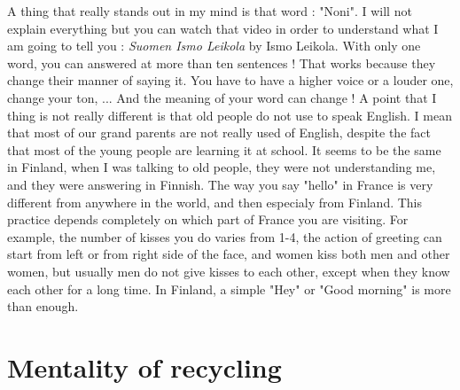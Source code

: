 \documentclass[a4paper,12pt]{report} %
\begin{document}
{A thing that really stands out in my mind is that word : "Noni". I will not explain everything but you can watch that video in order to understand what I am going to tell you : \textit{Suomen Ismo Leikola} by Ismo Leikola. With only one word, you can answered at more than ten sentences ! That works because they change their manner of saying it. You have to have a higher voice or a louder one, change your ton, ... And the meaning of your word can change ! \newline
A point that I thing is not really different is that old people do not use to speak English. I mean that most of our grand parents are not really used of English, despite the fact that most of the young people are learning it at school. It seems to be the same in Finland, when I was talking to old people, they were not understanding me, and they were answering in Finnish. \newline
The way you say "hello" in France is very different from anywhere in the world, and then especialy from Finland. This practice depends completely on which part of France you are visiting. For example, the number of kisses you do varies from 1-4, the action of greeting can start from left or from right side of the face, and women kiss both men and other women, but usually men do not give kisses to each other, except when they know each other for a long time. In Finland, a simple "Hey" or "Good morning" is more than enough.}

\section{Mentality of recycling}
\end{document}
